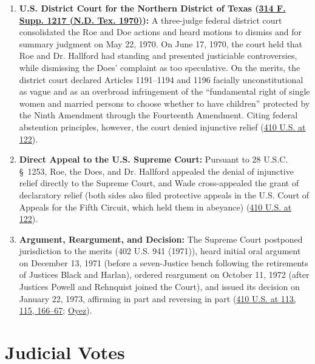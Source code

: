 \documentclass[12pt]{article}
\begin{document}
\begin{enumerate}
\item \textbf{U.S. District Court for the Northern District of Texas (\href{https://law.justia.com/cases/federal/district-courts/FSupp/314/1217/1472349/}{314 F. Supp. 1217 (N.D. Tex. 1970)}):} A three-judge federal district court consolidated the Roe and Doe actions and heard motions to dismiss and for summary judgment on May 22, 1970. On June 17, 1970, the court held that Roe and Dr. Hallford had standing and presented justiciable controversies, while dismissing the Does' complaint as too speculative. On the merits, the district court declared Articles 1191--1194 and 1196 facially unconstitutional as vague and as an overbroad infringement of the ``fundamental right of single women and married persons to choose whether to have children'' protected by the Ninth Amendment through the Fourteenth Amendment. Citing federal abstention principles, however, the court denied injunctive relief (\href{https://supreme.justia.com/cases/federal/us/410/113/}{410 U.S. at 122}).
\item \textbf{Direct Appeal to the U.S. Supreme Court:} Pursuant to 28 U.S.C. \S~1253, Roe, the Does, and Dr. Hallford appealed the denial of injunctive relief directly to the Supreme Court, and Wade cross-appealed the grant of declaratory relief (both sides also filed protective appeals in the U.S. Court of Appeals for the Fifth Circuit, which held them in abeyance) (\href{https://supreme.justia.com/cases/federal/us/410/113/}{410 U.S. at 122}).
\item \textbf{Argument, Reargument, and Decision:} The Supreme Court postponed jurisdiction to the merits (402 U.S. 941 (1971)), heard initial oral argument on December 13, 1971 (before a seven-Justice bench following the retirements of Justices Black and Harlan), ordered reargument on October 11, 1972 (after Justices Powell and Rehnquist joined the Court), and issued its decision on January 22, 1973, affirming in part and reversing in part (\href{https://supreme.justia.com/cases/federal/us/410/113/}{410 U.S. at 113, 115, 166--67}; \href{https://www.oyez.org/cases/1971/70-18}{Oyez}).
\end{enumerate}

\section{Judicial Votes}
\end{document}

